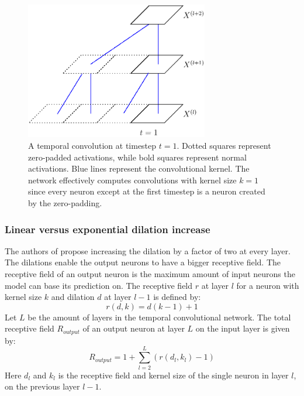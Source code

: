 \documentclass[a4paper, twoside]{article}
\begin{document}
\begin{figure}[h]
\begin{center}
    \includegraphics[width=8cm]{figTCNZeropad.eps}\caption{A temporal convolution at timestep $t=1$. Dotted squares represent zero-padded activations, while bold squares represent normal activations. Blue lines represent the convolutional kernel. The network effectively computes convolutions with kernel size $k=1$ since every neuron except at the first timestep is a neuron created by the zero-padding.}\label{figTCNZeropad}
\end{center}
\end{figure}

\subsubsection{Linear versus exponential dilation increase}
The authors of \cite{tcn} propose increasing the dilation by a factor of two at every layer. The dilations enable the output neurons to have a bigger receptive field. The receptive field of an output neuron is the maximum amount of input neurons the model can base its prediction on. The receptive field $r$ at layer $l$ for a neuron with kernel size $k$ and dilation $d$ at layer $l-1$ is defined by: 
\begin{equation}
r(d, k) = d(k-1) +1
\end{equation}
Let $L$ be the amount of layers in the temporal convolutional network. The total receptive field $R_{output}$ of an output neuron at layer $L$ on the input layer is given by:
\begin{equation}
R_{output} = 1+\sum^L_{l=2} (r(d_l, k_l) -1)
\end{equation}
Here $d_l$ and $k_l$ is the receptive field and kernel size of the single neuron in layer $l$, on the previous layer $l-1$.
\end{document}
